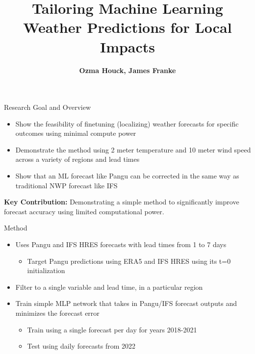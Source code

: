 \documentclass[aspectratio=169, xcolor=dvipsnames]{beamer}
\title{Tailoring Machine Learning Weather Predictions for Local Impacts}
\author{\textbf{Ozma Houck, James Franke}}
\date{}
\begin{document}
\maketitle


\begin{frame}{Research Goal and Overview}
\begin{itemize}
    \item Show the feasibility of finetuning (localizing) weather forecasts for specific outcomes using minimal compute power
    \item Demonstrate the method using 2 meter temperature and 10 meter wind speed across a variety of regions and lead times
    \item Show that an ML forecast like Pangu can be corrected in the same way as traditional NWP forecast like IFS
\end{itemize}

\vspace{0.5em}
\textbf{Key Contribution:} Demonstrating a simple method to significantly improve forecast accuracy using limited computational power.
\end{frame}


\begin{frame}{Method}
\begin{itemize}
    \item Uses Pangu and IFS HRES forecasts with lead times from 1 to 7 days
    \begin{itemize}
        \item Target Pangu predictions using ERA5 and IFS HRES using its t=0 initialization
    \end{itemize}
    \item Filter to a single variable and lead time, in a particular region
    \item Train simple MLP network that takes in Pangu/IFS forecast outputs and minimizes the forecast error
    \begin{itemize}
        \item Train using a single forecast per day for years 2018-2021
        \item Test using daily forecasts from 2022
    \end{itemize}
\end{itemize}
\end{frame}
\end{document}
